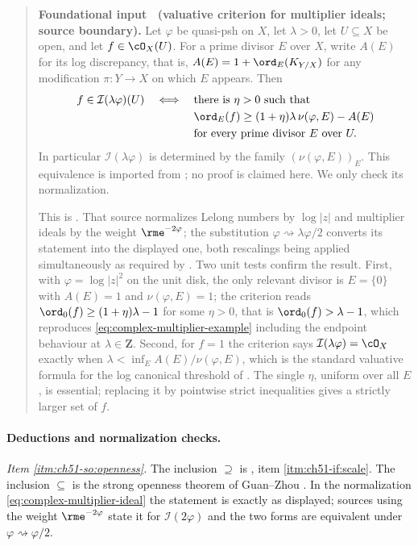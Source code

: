 \label{prop:ch51-valuative-criterion}
\begin{quote}
\textbf{Foundational input \theproposition\ (valuative criterion for
multiplier ideals; source boundary).}
Let \(\varphi\) be quasi-psh on \(X\), let \(\lambda>0\), let \(U\subseteq
X\) be open, and let \(f\in\cO_X(U)\).  For a prime divisor \(E\) over
\(X\), write \(A(E)\) for its log discrepancy, that is,
\(A(E)=1+\ord_E(K_{Y/X})\) for any modification \(\pi:Y\to X\) on which
\(E\) appears.  Then
\[
 f\in\mathcal I(\lambda\varphi)(U)
 \quad\Longleftrightarrow\quad
 \begin{aligned}[t]
 &\text{there is }\eta>0\text{ such that}\\
 &\ord_E(f)\geq(1+\eta)\lambda\,\nu(\varphi,E)-A(E)\\
 &\text{for every prime divisor }E\text{ over }U .
 \end{aligned}
\]
In particular \(\mathcal I(\lambda\varphi)\) is determined by the family
\((\nu(\varphi,E))_E\).
This equivalence is imported from \cite[Corollary~10.18]{Bou17}; no proof
is claimed here.  We only check its normalization.

This is \cite[Corollary~10.18]{Bou17}.  That source normalizes Lelong
numbers by \(\log|z|\) and multiplier ideals by the weight
\(\rme^{-2\varphi}\); the substitution
\(\varphi\rightsquigarrow\lambda\varphi/2\) converts its statement into the
displayed one, both rescalings being applied simultaneously as required by
.  Two unit tests confirm the result.  First, with
\(\varphi=\log|z|^2\) on the unit disk, the only relevant divisor is
\(E=\{0\}\) with \(A(E)=1\) and \(\nu(\varphi,E)=1\); the criterion reads
\(\ord_0(f)\geq(1+\eta)\lambda-1\) for some \(\eta>0\), that is
\(\ord_0(f)>\lambda-1\), which reproduces
\eqref{eq:complex-multiplier-example} including the endpoint behaviour at
\(\lambda\in\mathbf Z\).  Second, for \(f=1\) the criterion says
\(\mathcal I(\lambda\varphi)=\cO_X\) exactly when
\(\lambda<\inf_EA(E)/\nu(\varphi,E)\), which is the standard valuative
formula for the log canonical threshold of .  The single
\(\eta\), uniform over all \(E\), is essential; replacing it by pointwise
strict inequalities gives a strictly larger set of \(f\).
\end{quote}

\paragraph{Deductions and normalization checks.}
\emph{Item \cref{itm:ch51-so:openness}.}  The inclusion \(\supseteq\) is
, item \cref{itm:ch51-if:scale}.  The
inclusion \(\subseteq\) is the strong openness theorem of Guan--Zhou
\cite[Theorem~1.1]{GZ15}.  In the normalization
\eqref{eq:complex-multiplier-ideal} the statement is exactly as displayed;
sources using the weight \(\rme^{-2\varphi}\) state it for
\(\mathcal I(2\varphi)\) and the two forms are equivalent under
\(\varphi\rightsquigarrow\varphi/2\).


